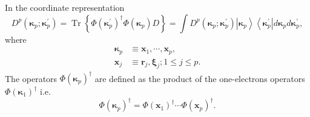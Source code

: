 \documentclass[aps,preprint]{revtex4}%
\begin{document}
In the coordinate representation
\begin{equation}
D^{p}\left(  \boldsymbol{\kappa}_{p};\boldsymbol{\kappa}_{p}^{\prime}\right)
=\operatorname{Tr}\left\{  \Phi\left(  \boldsymbol{\kappa}_{p}^{\prime
}\right)  ^{\dagger}\Phi\left(  \boldsymbol{\kappa}_{p}\right)  D\right\}
=\int D^{p}\left(  \boldsymbol{\kappa}_{p};\boldsymbol{\kappa}_{p}^{\prime
}\right)  \left\vert \boldsymbol{\kappa}_{p}\right\rangle \left\langle
\boldsymbol{\kappa}_{p}^{\prime}\right\vert d\boldsymbol{\kappa}%
_{p}d\boldsymbol{\kappa}_{p}^{\prime}, \label{DenMatDef}%
\end{equation}
where
\begin{align}
\boldsymbol{\kappa}_{p}  &  \equiv\boldsymbol{x}_{1},\cdots,\boldsymbol{x}%
_{p},\\
\boldsymbol{x}_{j}  &  \equiv\boldsymbol{r}_{j}\boldsymbol{,\xi}_{j};1\leq
j\leq p.\nonumber
\end{align}
The operators $\Phi\left(  \boldsymbol{\kappa}_{p}\right)  ^{\dagger}$ are
defined as the product of the one-electrons operators $\Phi\left(
\boldsymbol{\kappa}_{1}\right)  ^{\dagger}$ i.e.%
\begin{equation}
\Phi\left(  \boldsymbol{\kappa}_{p}\right)  ^{\dagger}=\Phi\left(
\boldsymbol{x}_{1}\right)  ^{\dagger}\cdots\Phi\left(  \boldsymbol{x}%
_{p}\right)  ^{\dagger}.
\end{equation}
\end{document}
